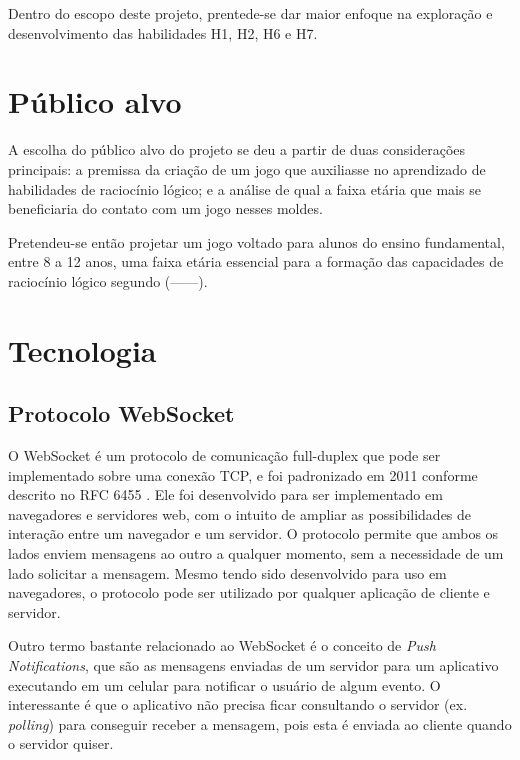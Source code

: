 Dentro do escopo deste projeto, prentede-se dar maior enfoque na exploração e desenvolvimento das habilidades H1, H2, H6 e H7.


\section{Público alvo}\label{sec-publico-alvo}

A escolha do público alvo do projeto se deu a partir de duas considerações principais: a premissa da criação de um jogo que auxiliasse no aprendizado de habilidades de raciocínio lógico; e a análise de qual a faixa etária que mais se beneficiaria do contato com um jogo nesses moldes.

Pretendeu-se então projetar um jogo voltado para alunos do ensino fundamental, entre 8 a 12 anos, uma faixa etária essencial para a formação das capacidades de raciocínio lógico segundo (------).

\section{Tecnologia}\label{sec-tecnologia}

\subsection{Protocolo WebSocket}\label{subsec-teo-websocket}

O WebSocket é um protocolo de comunicação full-duplex que pode ser implementado sobre uma conexão TCP, e foi padronizado em 2011 conforme descrito no RFC 6455 \cite{RFC:2011:websocket}. Ele foi desenvolvido para ser implementado em navegadores e servidores web, com o intuito de ampliar as possibilidades de interação entre um navegador e um servidor. O protocolo permite que ambos os lados enviem mensagens ao outro a qualquer momento, sem a necessidade de um lado solicitar a mensagem. Mesmo tendo sido desenvolvido para uso em navegadores, o protocolo pode ser utilizado por qualquer aplicação de cliente e servidor.

Outro termo bastante relacionado ao WebSocket é o conceito de \textit{Push Notifications}, que são as mensagens enviadas de um servidor para um aplicativo executando em um celular para notificar o usuário de algum evento. O interessante é que o aplicativo não precisa ficar consultando o servidor (ex. \textit{polling}) para conseguir receber a mensagem, pois esta é enviada ao cliente quando o servidor quiser.


